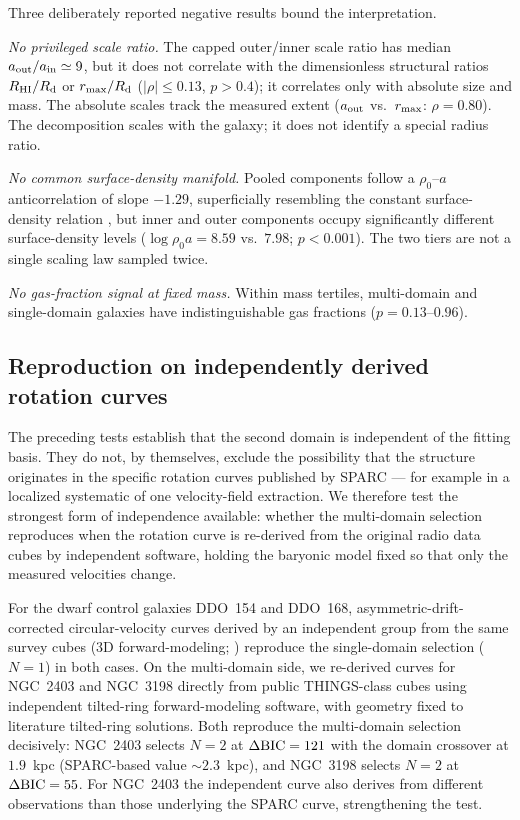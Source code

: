 \documentclass[twocolumn]{aastex631}
\newcommand{\dbic}{\Delta{\rm BIC}}
\begin{document}
Three deliberately reported negative results bound the interpretation.

\emph{No privileged scale ratio.} The capped outer/inner scale ratio has
median $a_{\rm out}/a_{\rm in} \simeq 9$, but it does not correlate with the
dimensionless structural ratios $R_{\rm HI}/R_{\rm d}$ or
$r_{\rm max}/R_{\rm d}$ ($|\rho| \le 0.13$, $p > 0.4$); it correlates only
with absolute size and mass. The absolute scales track the measured extent
($a_{\rm out}$ vs.\ $r_{\rm max}$: $\rho = 0.80$). The decomposition scales
with the galaxy; it does not identify a special radius ratio.

\emph{No common surface-density manifold.} Pooled components follow a
$\rho_0$--$a$ anticorrelation of slope $-1.29$, superficially resembling the
constant surface-density relation \citep{Donato2009}, but inner and outer
components occupy significantly different surface-density levels
($\log \rho_0 a = 8.59$ vs.\ $7.98$; $p < 0.001$). The two tiers are not a
single scaling law sampled twice.

\emph{No gas-fraction signal at fixed mass.} Within mass tertiles,
multi-domain and single-domain galaxies have indistinguishable gas fractions
($p = 0.13$--$0.96$).

\subsection{Reproduction on independently derived rotation curves} \label{sec:dataindep}

The preceding tests establish that the second domain is independent of the
fitting basis. They do not, by themselves, exclude the possibility that the
structure originates in the specific rotation curves published by SPARC --- for
example in a localized systematic of one velocity-field extraction. We therefore
test the strongest form of independence available: whether the multi-domain
selection reproduces when the rotation curve is re-derived from the original
radio data cubes by independent software, holding the baryonic model fixed so
that only the measured velocities change.

For the dwarf control galaxies DDO~154 and DDO~168, asymmetric-drift-corrected
circular-velocity curves derived by an independent group from the same survey
cubes (3D forward-modeling; \citealt{Iorio2017}) reproduce the single-domain
selection ($N=1$) in both cases. On the multi-domain side, we re-derived curves
for NGC~2403 and NGC~3198 directly from public THINGS-class cubes using
independent tilted-ring forward-modeling software, with geometry fixed to
literature tilted-ring solutions. Both reproduce the multi-domain selection
decisively: NGC~2403 selects $N=2$ at $\dbic = 121$ with the domain crossover at
$1.9$~kpc (SPARC-based value $\sim 2.3$~kpc), and NGC~3198 selects $N=2$ at
$\dbic = 55$. For NGC~2403 the independent curve also derives from different
observations than those underlying the SPARC curve, strengthening the test.
\end{document}
